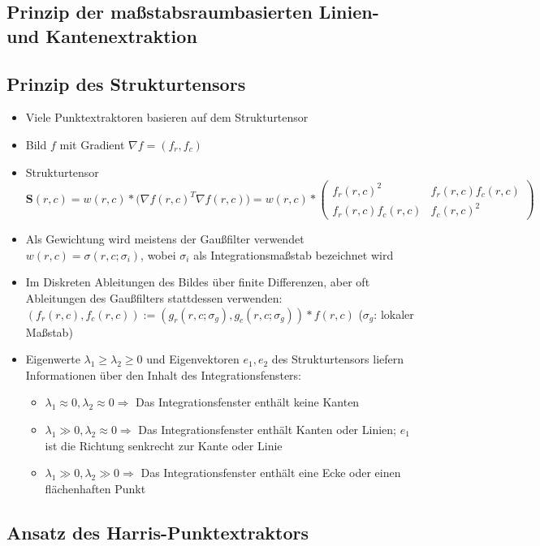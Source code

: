 \documentclass[11pt]{article}
\begin{document}
\subsection{Prinzip der maßstabsraumbasierten Linien- und Kantenextraktion}
\subsection{Prinzip des Strukturtensors}

\begin{itemize}
    \item Viele Punktextraktoren basieren auf dem Strukturtensor
    \item Bild $f$ mit Gradient $\nabla f = (f_r, f_c)$
    \item Strukturtensor $\boldsymbol{S}(r, c) = w(r, c) \ast \big(\nabla f(r, c)^T \nabla f(r, c)\big) = w(r, c) \ast \begin{pmatrix} f_r(r, c)^2 & f_r(r, c) f_c(r, c) \\ f_r(r, c) f_c(r, c) & f_c(r, c)^2 \end{pmatrix}$
    \item Als Gewichtung wird meistens der Gaußfilter verwendet $w(r, c) = \sigma(r, c; \sigma_i)$, wobei $\sigma_i$ als Integrationsmaßstab bezeichnet wird
    \item Im Diskreten Ableitungen des Bildes über finite Differenzen, aber oft Ableitungen des Gaußfilters stattdessen verwenden: $(f_r(r, c), f_c(r, c)) := (g_r(r, c; \sigma_g), g_c(r, c; \sigma_g)) \ast f(r, c)$ ($\sigma_g$: lokaler Maßstab)
    \item Eigenwerte $\lambda_1 \ge \lambda_2 \ge 0$ und Eigenvektoren $e_1, e_2$ des Strukturtensors liefern Informationen über den Inhalt des Integrationsfensters:
        \begin{itemize}
            \item $\lambda_1 \approx 0, \lambda_2 \approx 0 \Rightarrow$ Das Integrationsfenster enthält keine Kanten
            \item $\lambda_1 \gg 0, \lambda_2 \approx 0 \Rightarrow$ Das Integrationsfenster enthält Kanten oder Linien; $e_1$ ist die Richtung senkrecht zur Kante oder Linie
            \item $\lambda_1 \gg 0, \lambda_2 \gg 0 \Rightarrow$ Das Integrationsfenster enthält eine Ecke oder einen flächenhaften Punkt
        \end{itemize}
\end{itemize}

\subsection{Ansatz des Harris-Punktextraktors}
\end{document}
